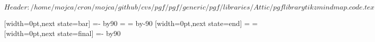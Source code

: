\ProvidesPackageRCS[v\pgfversion] $Header: /home/mojca/cron/mojca/github/cvs/pgf/pgf/generic/pgf/libraries/Attic/pgflibrarytikzmindmap.code.tex,v 1.5 2006/04/28 11:52:13 tantau Exp $

%




%

{
  [width=0pt,next state=bar]
  {
    {
    \pgftransformxshift{-1pt}%
    \pgftransformxshift{-\pgfsnakecirclestartradius}%
    \pgfpathmoveto{\pgfpointpolar{\pgfsnakesegmentangle}{\pgfsnakecirclestartradius}}
    \pgfpatharc{\pgfsnakesegmentangle}{-\pgfsnakesegmentangle}{\pgfsnakecirclestartradius}
    \@tempcnta=-\pgfsnakesegmentangle\relax
    \advance\@tempcnta by90\relax
    \@tempdima=\pgfsnakecirclestartradius\relax
    \pgfpathcurveto
    {\pgfpointadd
      {\pgfpointpolar{-\pgfsnakesegmentangle}{\pgfsnakecirclestartradius}}
      {}}
    {}
    {}
    \@tempcnta=\pgfsnakesegmentangle\relax
    \advance\@tempcnta by-90\relax
    \pgfpathcurveto
    {}
    {\pgfpointadd
      {\pgfpointpolar{\pgfsnakesegmentangle}{\pgfsnakecirclestartradius}}
      {}}
    {\pgfpointpolar{\pgfsnakesegmentangle}{\pgfsnakecirclestartradius}}
    \pgfpathclose
    }
  }
  [width=0pt,next state=end]
  {
    \@tempdima=\pgfsnakecirclestartradius\relax
    \@tempdimb=\pgfsnakecircleendradius\relax
    \pgfpathrectangle
    {}
    {}
  }
  [width=0pt,next state=final]
  {
    {
    \pgftransformxshift{\pgfsnakeremainingdistance}%
    \pgftransformxshift{1pt}%
    \pgftransformxshift{-\pgfsnakecircleendradius}%
    \pgfpathmoveto{\pgfpointpolar{\pgfsnakesegmentangle}{\pgfsnakecircleendradius}}
    \pgfpatharc{\pgfsnakesegmentangle}{-\pgfsnakesegmentangle}{\pgfsnakecircleendradius}
    \@tempcnta=-\pgfsnakesegmentangle\relax
    \advance\@tempcnta by90\relax
}}}
